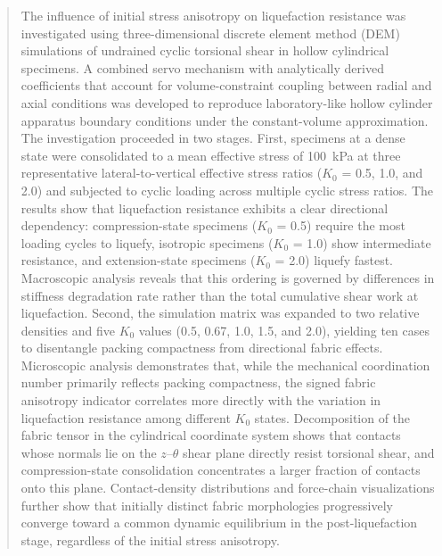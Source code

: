\documentclass[a4paper,fleqn]{cas-sc}
\newcommand{\Kzero}{\ensuremath{K_0}}
\begin{document}
\begin{abstract}
The influence of initial stress anisotropy on liquefaction resistance was investigated using three-dimensional discrete element method (DEM) simulations of undrained cyclic torsional shear in hollow cylindrical specimens. A combined servo mechanism with analytically derived coefficients that account for volume-constraint coupling between radial and axial conditions was developed to reproduce laboratory-like hollow cylinder apparatus boundary conditions under the constant-volume approximation. The investigation proceeded in two stages. First, specimens at a dense state were consolidated to a mean effective stress of 100~kPa at three representative lateral-to-vertical effective stress ratios (\Kzero{} = 0.5, 1.0, and 2.0) and subjected to cyclic loading across multiple cyclic stress ratios. The results show that liquefaction resistance exhibits a clear directional dependency: compression-state specimens (\Kzero{} = 0.5) require the most loading cycles to liquefy, isotropic specimens (\Kzero{} = 1.0) show intermediate resistance, and extension-state specimens (\Kzero{} = 2.0) liquefy fastest. Macroscopic analysis reveals that this ordering is governed by differences in stiffness degradation rate rather than the total cumulative shear work at liquefaction. Second, the simulation matrix was expanded to two relative densities and five \Kzero{} values (0.5, 0.67, 1.0, 1.5, and 2.0), yielding ten cases to disentangle packing compactness from directional fabric effects. Microscopic analysis demonstrates that, while the mechanical coordination number primarily reflects packing compactness, the signed fabric anisotropy indicator correlates more directly with the variation in liquefaction resistance among different \Kzero{} states. Decomposition of the fabric tensor in the cylindrical coordinate system shows that contacts whose normals lie on the $z$--$\theta$ shear plane directly resist torsional shear, and compression-state consolidation concentrates a larger fraction of contacts onto this plane. Contact-density distributions and force-chain visualizations further show that initially distinct fabric morphologies progressively converge toward a common dynamic equilibrium in the post-liquefaction stage, regardless of the initial stress anisotropy.
\end{abstract}
\end{document}
